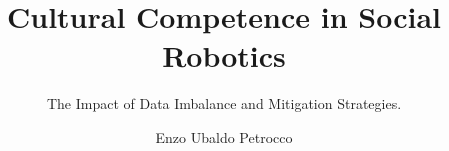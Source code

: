 \title{Cultural Competence in Social Robotics}

\subtitle{The Impact of Data Imbalance and Mitigation Strategies.}

\author{Enzo Ubaldo Petrocco}




\subject{LaTeX} 
